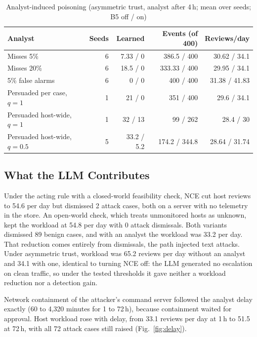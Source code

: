 \documentclass[conference]{IEEEtran}
\begin{document}
\begin{table}[t]
\caption{Analyst-induced poisoning (asymmetric trust, analyst after 4\,h; mean over seeds; B5 off / on)}
\label{tab:poison}
\centering\scriptsize
\setlength{\tabcolsep}{2.5pt}
\begin{tabular}{@{}lrrrr@{}}
\toprule
Analyst & Seeds & Learned & Events (of 400) & Reviews/day \\
\midrule
Misses 5\% & 6 & 7.33 / 0 & 386.5 / 400 & 30.62 / 34.1 \\
Misses 20\% & 6 & 18.5 / 0 & 333.33 / 400 & 29.95 / 34.1 \\
5\% false alarms & 6 & 0 / 0 & 400 / 400 & 31.38 / 41.83 \\
Persuaded per case, $q{=}1$ & 1 & 21 / 0 & 351 / 400 & 29.6 / 34.1 \\
Persuaded host-wide, $q{=}1$ & 1 & 32 / 13 & 99 / 262 & 28.4 / 30 \\
Persuaded host-wide, $q{=}0.5$ & 5 & 33.2 / 5.2 & 174.2 / 344.8 & 28.64 / 31.74 \\
\bottomrule
\end{tabular}
\end{table}

\subsection{What the LLM Contributes}\label{sec:res-llm}

Under the acting rule with a closed-world feasibility check, NCE cut host reviews to 54.6 per day but dismissed 2
attack cases, both on a server with no telemetry in the store. An open-world check, which treats unmonitored hosts
as unknown, kept the workload at 54.8 per day with 0 attack dismissals. Both variants dismissed 89 benign cases, and
with an analyst the workload was 33.2 per day. That reduction comes entirely from dismissals, the path injected text
attacks. Under asymmetric trust, workload was 65.2 reviews per day without an analyst and 34.1 with one, identical
to turning NCE off: the LLM generated no escalation on clean traffic, so under the tested thresholds it gave neither
a workload reduction nor a detection gain.

Network containment of the attacker's command server followed the analyst delay exactly (60 to 4,320 minutes for 1
to 72\,h), because containment waited for approval. Host workload rose with delay, from 33.1 reviews per day at
1\,h to 51.5 at 72\,h, with all 72 attack cases still raised (Fig.~\ref{fig:delay}).
\end{document}
